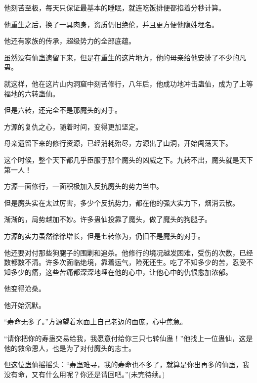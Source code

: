 \begin{this_body}
他刻苦至极，每天只保证最基本的睡眠，就连吃饭排便都掐着分秒计算。

他重生之后，换了一具肉身，资质仍旧绝伦，并且更方便他隐姓埋名。

他还有家族的传承，超级势力的全部底蕴。

虽然没有仙蛊遗留下来，但是在重生的这片地方，他的母亲给他安排了不少的凡蛊。

就这样，他在这片山内洞窟中刻苦修行，八年后，他成功地冲击蛊仙，成为了上等福地的六转蛊仙。

但是六转，还完全不是那魔头的对手。

方源的复仇之心，随着时间，变得更加坚定。

母亲遗留下来的修行资源，已经消耗殆尽，方源出了山洞，开始闯荡天下。

这个时候，整个天下都几乎臣服于那个魔头的凶威之下。九转不出，魔头就是天下第一人！

方源一面修行，一面积极加入反抗魔头的势力当中。

但是魔头实在太过厉害，多少个反抗势力，都在他的强大实力下，烟消云散。

渐渐的，局势越加不妙。许多蛊仙投靠了魔头，做了魔头的狗腿子。

方源的实力虽然徐徐增长，但是七转修为，仍旧不是魔头的对手。

他还要对付那些狗腿子的围剿和追杀。他修行的境况越发困难，受伤的次数，已经数都数不清。许多次面临绝境，靠着运气，险死还生。吃了不知多少的苦，忍受不知多少的痛，这些苦痛都深深地埋在他的心中，让他心中的仇恨愈加浓郁。

他变得沧桑。

他开始沉默。

“寿命无多了。”方源望着水面上自己老迈的面庞，心中焦急。

“请你把你的寿蛊交易给我，我愿意付给你三只七转仙蛊！”他找上一位蛊仙，这是他的救命恩人，也是为了对付魔头的志士。

但这位蛊仙摇摇头：“寿蛊难寻，我的寿命也不多了，就算是你出再多的仙蛊，我没有命，又有什么用呢？你还是请回吧。”(未完待续。)

\end{this_body}

